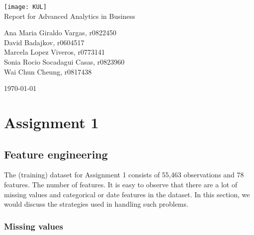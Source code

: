 \documentclass[12pt]{article}
\begin{document}
\begin{titlepage}
	\begin{center}
	\vspace*{1cm}
    \texttt{[image: KUL]}\\
	\vspace{2.5cm}
    {\Large Report for Advanced Analytics in Business}
            
    \vspace{1.5cm}

    {\large Ana Maria Giraldo Vargas, r0822450}\\
    \vspace{0.5cm}
    {\large David Badajkov, r0604517}\\
    \vspace{0.5cm}
    {\large Marcela 	Lopez Viveros, r0773141}\\
	\vspace{0.5cm}
	{\large Sonia Rocio 	Socadagui Casas, r0823960}\\
	\vspace{0.5cm}
    {\large Wai Chun Cheung, r0817438}
    \vspace{1.5cm}


       \today
   \end{center}
\end{titlepage}

\newpage
\tableofcontents
\newpage

\section*{Assignment 1}


\subsection*{Feature engineering}

The (training) dataset for Assignment 1 consists of 55,463 observations and 78 features. The number of features. It is easy to observe that there are a lot of missing values and categorical or date features in the dataset. In this section, we would discuss the strategies used in handling such problems. 

\subsubsection*{Missing values}
\end{document}
